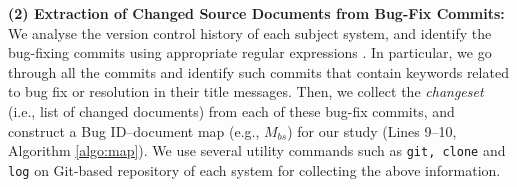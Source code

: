 \documentclass[conference]{IEEEtran}
\let\footnotesize\scriptsize
\begin{document}



\textbf{(2) Extraction of Changed Source Documents from Bug-Fix Commits:}
We analyse the version control history of each subject system, and identify the bug-fixing commits using appropriate regular expressions \cite{bugid,Wang2}.
In particular, we go through all the commits and identify such commits that contain keywords related to bug fix or resolution in their title messages.
Then, we collect the \emph{changeset} (i.e., list of changed documents)
from each of these bug-fix commits, and construct a Bug ID--document map (e.g., $M_{bs}$) for our study (Lines 9--10, Algorithm \ref{algo:map}). 
We use several
utility commands such as \texttt{git, clone} and \texttt{log} on Git-based repository of each system for collecting the above information. 

\end{document}
